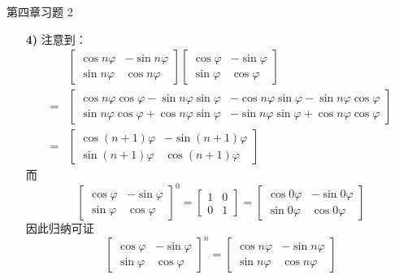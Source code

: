 \begin{problem}
	第四章习题 2

	\begin{solution}
		\begin{enumerate}
			\item[\textbf{4)}] 注意到：
			$$
			\begin{aligned}
				& \begin{bmatrix}
					\cos n \varphi & -\sin n \varphi \\
					\sin n \varphi & \cos n \varphi
				\end{bmatrix} \begin{bmatrix}
					\cos \varphi & -\sin \varphi \\
					\sin \varphi & \cos \varphi
				\end{bmatrix} \\
				= & \begin{bmatrix}
					\cos n \varphi \cos \varphi - \sin n \varphi \sin \varphi &
					-\cos n \varphi \sin \varphi - \sin n \varphi \cos \varphi \\
					\sin n \varphi \cos \varphi + \cos n \varphi \sin \varphi &
					-\sin n \varphi \sin \varphi + \cos n \varphi \cos \varphi
				\end{bmatrix} \\
				= & \begin{bmatrix}
					\cos (n+1)\varphi & -\sin (n+1)\varphi \\
					\sin (n+1)\varphi & \cos (n+1)\varphi
				\end{bmatrix}
			\end{aligned}
			$$
			而
			$$
			\begin{bmatrix}
				\cos \varphi & -\sin \varphi \\
				\sin \varphi & \cos \varphi
			\end{bmatrix}^0 = \begin{bmatrix}
				1 & 0 \\
				0 & 1
			\end{bmatrix} = \begin{bmatrix}
				\cos 0\varphi & -\sin 0\varphi \\
				\sin 0\varphi & \cos 0\varphi
			\end{bmatrix}
			$$
			因此归纳可证
			$$
			\begin{bmatrix}
				\cos \varphi & -\sin \varphi \\
				\sin \varphi & \cos \varphi
			\end{bmatrix}^n = \begin{bmatrix}
				\cos n \varphi & -\sin n \varphi \\
				\sin n \varphi & \cos n \varphi
			\end{bmatrix}
			$$


\end{enumerate}
\end{solution}
\end{problem}
